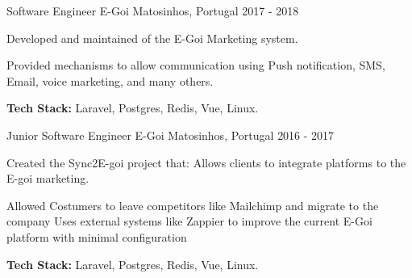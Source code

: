 \begin{cventries}
    \cventry
      {Software Engineer} %
      {E-Goi} %
      {Matosinhos, Portugal} %
      {2017 - 2018} %
      {
        \begin{cvitems} %
          \item {Developed and maintained of the E-Goi Marketing system.}
          \item {Provided mechanisms to allow communication using Push notification, SMS, Email, voice marketing, and many others.}
          \item {\textbf{Tech Stack:} Laravel, Postgres, Redis, Vue, Linux.}
        \end{cvitems}
      }
  
    \cventry
      {Junior Software Engineer} %
      {E-Goi} %
      {Matosinhos, Portugal} %
      {2016 - 2017} %
      {
        \begin{cvitems} %
          \item {Created the Sync2E-goi project that: Allows clients to integrate platforms to the E-goi marketing.}
          \item {Allowed Costumers to leave competitors like Mailchimp and migrate to the company Uses external systems like Zappier to improve the current E-Goi platform with minimal configuration}
          \item {\textbf{Tech Stack:} Laravel, Postgres, Redis, Vue, Linux.}
        \end{cvitems}
      }
  
  \end{cventries}
  